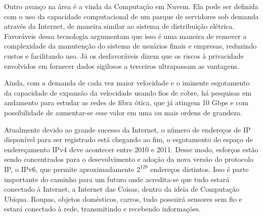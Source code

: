 \documentclass[brazil,times]{abnt}
\begin{document}
Outro avanço na área é a vinda da Computação em Nuvem. Ela pode ser definida com
o uso da capacidade computacional de um parque de servidores sob demanda através
da Internet, de maneira similar ao sistema de distribuição elétrica. Favoráveis 
dessa tecnologia argumentam que isso é uma maneira de remover a complexidade da
manutenção do sistema de usuários finais e empresas, reduzindo custos e
facilitando uso. Já os desfavoráveis dizem que os riscos à privacidade
envolvidos em fornecer dados sigilosos a terceiros ultrapassam as vantagens.
\cite{wiki:computacao-nuvem}

Ainda, com a demanda de cada vez maior velocidade e o iminente
esgotamento da capacidade de expansão da velocidade usando fios de cobre, há
pesquisas em andamento para estudar as redes de fibra ótica, que já atingem 10
Gbps e com possibilidade de aumentar-se esse valor em uma ou mais ordens de
grandeza.

Atualmente devido ao grande sucesso da Internet, o número de endereços de IP
disponível para ser registrado está chegando ao fim, o esgotamento do espaço de
endereçamento IPv4 deve acontecer entre 2010 e 2011. Desse modo, esforços estão
sendo concentrados para o desevolvimento e adoção da nova versão do protocolo
IP, o IPv6, que permite aproximadamente $2^{128}$ endereços distintos. Isso é
parte importante do caminho para um futuro onde acredita-se que tudo estará
conectado à Internet, a Internet das Coisas, dentro da ideia de Computação
Ubíqua. Roupas, objetos domésticos, carros, tudo possuirá sensores sem fio e estará
conectado à rede, transmitindo e recebendo informações.
\end{document}
